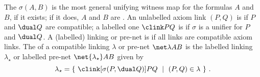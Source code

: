 The  $\sigma(A,B)$ is the most general unifying witness map for the formulas $A$ and $B$, if it exists; if it does, $A$ and $B$ are . An unlabelled axiom link $(P,Q)$ is  if $P$ and $\dual Q$ are compatible; a labelled one $\clink PQ$ is  if $\sigma$ is a unifier for $P$ and $\dual Q$. A (labelled) linking or pre-net is  if all links are compatible axiom links. The  of a compatible linking $\lambda$ or pre-net $\net\lambda AB$ is the labelled linking $\lambda_\star$ or labelled pre-net $\net{\lambda_\star}AB$ given by
\[
	\lambda_\star = \{~\clink[\sigma(P,\dual Q)]PQ~\mid~(P,Q)\in\lambda~\}~.
\]






